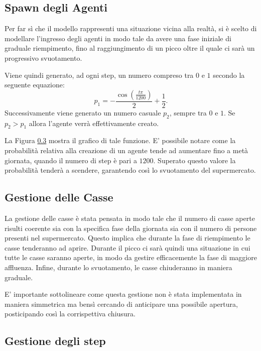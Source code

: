 \subsection{Spawn degli Agenti}
Per far sì che il modello rappresenti una situazione vicina alla realtà, si è scelto di modellare l'ingresso degli agenti in modo tale da avere una fase iniziale di graduale riempimento, fino al raggiungimento di un picco oltre il quale ci sarà un progressivo svuotamento.

Viene quindi generato, ad ogni step, un numero compreso tra $0$ e $1$ secondo la seguente equazione:
\begin{equation*}
p_1 = -\frac{\cos\left(\frac{t\pi}{1200}\right)}{2}+\frac{1}{2} .
\end{equation*}
Successivamente viene generato un numero casuale $p_2$, sempre tra $0$ e $1$. 
Se $p_2 > p_1$ allora l'agente verrà effettivamente creato.

La Figura \ref{} mostra il grafico di tale funzione. 
E' possibile notare come la probabilità relativa alla creazione di un agente tende ad aumentare fino a metà giornata, quando il numero di step è pari a $1200$. 
Superato questo valore la probabilità tenderà a scendere, garantendo così lo svuotamento del supermercato.

\subsection{Gestione delle Casse}
La gestione delle casse è stata pensata in modo tale che il numero di casse aperte risulti coerente sia con la specifica fase della giornata sia con il numero di persone presenti nel supermercato.
Questo implica che durante la fase di riempimento le casse tenderanno ad aprire. 
Durante il picco ci sarà quindi una situazione in cui tutte le casse saranno aperte, in modo da gestire efficacemente la fase di maggiore affluenza. 
Infine, durante lo svuotamento, le casse chiuderanno in maniera graduale. 

E' importante sottolineare come questa gestione non è stata implementata in maniera simmetrica ma bensì cercando di anticipare una possibile apertura, posticipando così la corrispettiva chiusura. 

\subsection{Gestione degli step}
